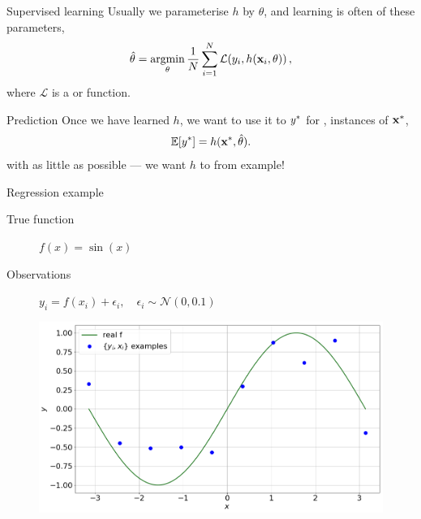 \documentclass[lualatex, aspectratio=169]{beamer}
\begin{document}
\begin{frame}{Supervised learning}
  Usually we parameterise $h$ by $\theta$, and learning is often  of these parameters,
  \begin{align*}
    \hat{\theta} = \argmin_\theta \frac{1}{N} \sum^N_{i=1} \mathcal{L}\!\left(y_i, h(\v{x}_i, \theta)\right),
  \end{align*}
  where $\mathcal{L}$ is a  or  function.

\end{frame}


\begin{frame}{Prediction}
  Once we have learned $h$, we want to use it to  ${y}^{*}$ for ,  instances of ${\mathbf{x}}^{*}$,
  \begin{align*}
    \mathbb{E}\!\left[{{y}^{*}}\right] = h({\mathbf{x}}^{*}, \hat{\theta}).
  \end{align*}
  with as little  as possible --- we want $h$ to  from example!
\end{frame}


\begin{frame}{Regression example}

  \begin{description}
    \item[True function] $f(x) = \sin(x)$
    \item[Observations] $y_i = f(x_i) + \epsilon_i, \quad \epsilon_i \sim \mathcal{N}(0, 0.1)$
  \end{description}

  \begin{figure}
    \includegraphics[width=0.5\pagewidth]{assets/regress.png}
  \end{figure}

\end{frame}
\end{document}
